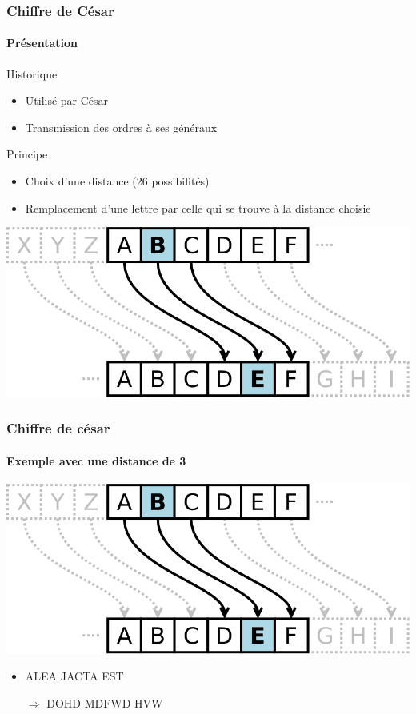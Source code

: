 \documentclass[xcolor={dvipsnames}]{beamer}
\begin{document}
\begin{frame}
\frametitle{Chiffre de César}
\framesubtitle{Présentation}

\begin{block}{Historique}
	\begin{itemize}
		\item Utilisé par César 
		\item Transmission des ordres à ses généraux 
	\end{itemize}
	\end{block}
	
	\begin{block}{Principe}
		\begin{itemize}
			\item Choix d'une distance (26 possibilités)
			\item Remplacement d'une lettre par celle qui se trouve à la distance choisie   
		\end{itemize}
		
		\begin{center}
			\includegraphics[scale=0.2]{cesar}			
		\end{center}

	\end{block}
	
\end{frame}




\begin{frame}
\frametitle{Chiffre de césar}
\framesubtitle{Exemple avec une distance de 3}


	\begin{center}
		\includegraphics[scale=0.2]{cesar}			
	\end{center}

\begin{itemize}
	\item ALEA JACTA EST\pause
	\item[$\Rightarrow$] DOHD MDFWD HVW
\end{itemize}


\end{frame}
\end{document}
